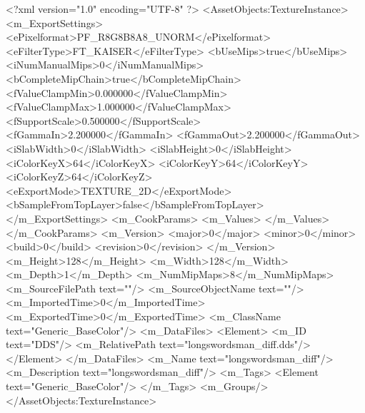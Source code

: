 <?xml version="1.0" encoding="UTF-8" ?>
<AssetObjects:TextureInstance>
<m_ExportSettings>
<ePixelformat>PF_R8G8B8A8_UNORM</ePixelformat>
<eFilterType>FT_KAISER</eFilterType>
<bUseMips>true</bUseMips>
<iNumManualMips>0</iNumManualMips>
<bCompleteMipChain>true</bCompleteMipChain>
<fValueClampMin>0.000000</fValueClampMin>
<fValueClampMax>1.000000</fValueClampMax>
<fSupportScale>0.500000</fSupportScale>
<fGammaIn>2.200000</fGammaIn>
<fGammaOut>2.200000</fGammaOut>
<iSlabWidth>0</iSlabWidth>
<iSlabHeight>0</iSlabHeight>
<iColorKeyX>64</iColorKeyX>
<iColorKeyY>64</iColorKeyY>
<iColorKeyZ>64</iColorKeyZ>
<eExportMode>TEXTURE_2D</eExportMode>
<bSampleFromTopLayer>false</bSampleFromTopLayer>
</m_ExportSettings>
<m_CookParams>
<m_Values>
</m_Values>
</m_CookParams>
<m_Version>
<major>0</major>
<minor>0</minor>
<build>0</build>
<revision>0</revision>
</m_Version>
<m_Height>128</m_Height>
<m_Width>128</m_Width>
<m_Depth>1</m_Depth>
<m_NumMipMaps>8</m_NumMipMaps>
<m_SourceFilePath text=""/>
<m_SourceObjectName text=""/>
<m_ImportedTime>0</m_ImportedTime>
<m_ExportedTime>0</m_ExportedTime>
<m_ClassName text="Generic_BaseColor"/>
<m_DataFiles>
<Element>
<m_ID text="DDS"/>
<m_RelativePath text="longswordsman_diff.dds"/>
</Element>
</m_DataFiles>
<m_Name text="longswordsman_diff"/>
<m_Description text="longswordsman_diff"/>
<m_Tags>
<Element text="Generic_BaseColor"/>
</m_Tags>
<m_Groups/>
</AssetObjects:TextureInstance>
